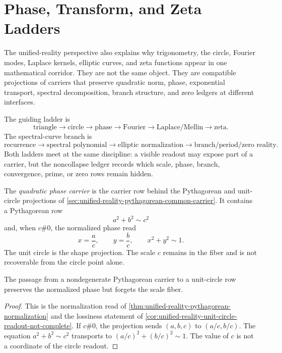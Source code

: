 \section{Phase, Transform, and Zeta Ladders}
\label{sec:unified-reality-phase-transform-zeta-ladder}

The unified-reality perspective also explains why trigonometry, the
circle, Fourier modes, Laplace kernels, elliptic curves, and zeta
functions appear in one mathematical corridor. They are not the same
object. They are compatible projections of carriers that preserve
quadratic norm, phase, exponential transport, spectral decomposition,
branch structure, and zero ledgers at different interfaces.

The guiding ladder is
$$
\text{triangle}
\to
\text{circle}
\to
\text{phase}
\to
\text{Fourier}
\to
\text{Laplace/Mellin}
\to
\text{zeta}.
$$
The spectral-curve branch is
$$
\text{recurrence}
\to
\text{spectral polynomial}
\to
\text{elliptic normalization}
\to
\text{branch/period/zero reality}.
$$
Both ladders meet at the same discipline: a visible readout may expose
part of a carrier, but the noncollapse ledger records which scale,
phase, branch, convergence, prime, or zero rows remain hidden.

\begin{definition}
\label{def:unified-reality-quadratic-phase-carrier}
The \emph{quadratic phase carrier} is the carrier row behind the
Pythagorean and unit-circle projections of
\autoref{sec:unified-reality-pythagorean-common-carrier}. It contains a
Pythagorean row
$$
a^2+b^2\sim c^2
$$
and, when $c\#0$, the normalized phase read
$$
x=\frac ac,
\qquad
y=\frac bc,
\qquad
x^2+y^2\sim1.
$$
The unit circle is the shape projection. The scale $c$ remains in the
fiber and is not recoverable from the circle point alone.
\end{definition}

\begin{theorem}
\label{thm:unified-reality-triangle-circle-scale-fiber}
The passage from a nondegenerate Pythagorean carrier to a unit-circle
row preserves the normalized phase but forgets the scale fiber.
\end{theorem}

\begin{proof}
This is the normalization read of
\autoref{thm:unified-reality-pythagorean-normalization} and the
lossiness statement of
\autoref{cor:unified-reality-unit-circle-readout-not-complete}. If
$c\#0$, the projection sends $(a,b,c)$ to $(a/c,b/c)$. The equation
$a^2+b^2\sim c^2$ transports to $(a/c)^2+(b/c)^2\sim1$. The value of
$c$ is not a coordinate of the circle readout.
\end{proof}

